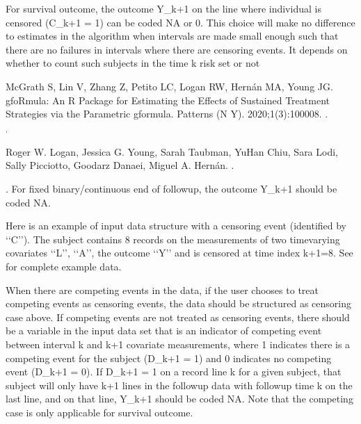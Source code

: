 \documentclass[letterpaper,10pt,english]{sphinxmanual}
\begin{document}
\sphinxAtStartPar
For survival outcome, the outcome Y\_k+1 on the line where individual is censored (C\_k+1 = 1) can be coded NA or 0.
This choice will make no difference to estimates in the algorithm when intervals are made small enough
such that there are no failures in intervals where there are censoring events. It depends on
whether to count such subjects in the time k risk set or not \sphinxstepexplicit %
\begin{footnote}[1]\label{\thesphinxscope.1}%
\sphinxAtStartFootnote
McGrath S, Lin V, Zhang Z, Petito LC, Logan RW, Hernán MA, Young JG. gfoRmula: An R Package for Estimating the Effects of Sustained Treatment Strategies via the Parametric g\sphinxhyphen{}formula. Patterns (N Y). 2020;1(3):100008. .
%
\end{footnote} $^{\text{,}}$ \sphinxstepexplicit %
\begin{footnote}[2]\label{\thesphinxscope.2}%
\sphinxAtStartFootnote
Roger W. Logan, Jessica G. Young, Sarah Taubman, Yu\sphinxhyphen{}Han Chiu, Sara Lodi, Sally Picciotto, Goodarz Danaei, Miguel A. Hernán. .
%
\end{footnote}. For fixed binary/continuous end of follow\sphinxhyphen{}up, the
outcome Y\_k+1 should be coded NA.

\sphinxAtStartPar
Here is an example of input data structure with a censoring event (identified by ‘‘C’’). The subject contains 8 records on the measurements of
two time\sphinxhyphen{}varying covariates ‘‘L’’, ‘‘A’’, the outcome ‘‘Y’’ and is censored at time index k+1=8. See  for complete example data.
\begin{quote}

\end{quote}

\sphinxAtStartPar
{} When there are competing events in the data, if the user chooses to treat competing
events as censoring events, the data should be structured as censoring case above. If competing events
are not treated as censoring events, there should be a variable in the input data set that is an
indicator of competing event between interval k and k+1 covariate measurements, where
1 indicates there is a competing event for the subject (D\_k+1 = 1) and 0 indicates no competing event (D\_k+1 = 0).
If D\_k+1 = 1 on a record line k for a given subject, that subject will only have k+1 lines
in the follow\sphinxhyphen{}up data with follow\sphinxhyphen{}up time k on the last line, and on that line, Y\_k+1 should be coded NA.
Note that the competing case is only applicable for survival outcome.
\end{document}
